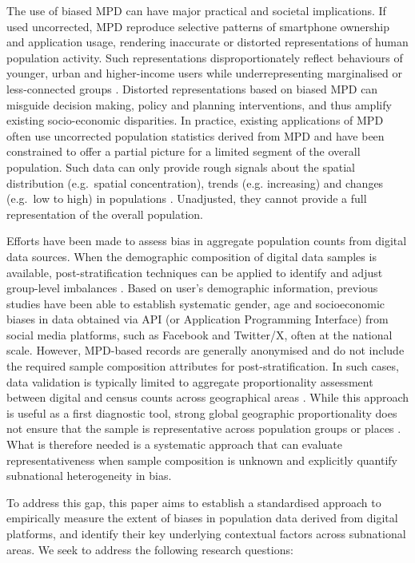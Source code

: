 \documentclass[]{rsos}%
\begin{document}
The use of biased MPD can have major practical and societal
implications. If used uncorrected, MPD reproduce selective patterns of
smartphone ownership and application usage, rendering inaccurate or
distorted representations of human population activity. Such
representations disproportionately reflect behaviours of younger, urban
and higher-income users while underrepresenting marginalised or
less-connected groups \citep{porter2012, wesolowski13-biases}. Distorted
representations based on biased MPD can misguide decision making, policy
and planning interventions, and thus amplify existing socio-economic
disparities. In practice, existing applications of MPD often use
uncorrected population statistics derived from MPD and have been
constrained to offer a partial picture for a limited segment of the
overall population. Such data can only provide rough signals about the
spatial distribution (e.g.~spatial concentration), trends (e.g.
increasing) and changes (e.g.~low to high) in populations
\citep{rowe22-sensing-ukraine}. Unadjusted, they cannot provide a full
representation of the overall population.

Efforts have been made to assess bias in aggregate population counts
from digital data sources. When the demographic composition of digital
data samples is available, post-stratification techniques can be applied
to identify and adjust group-level imbalances \citep{ribeiro20-facebook, gil-clavel2019}. Based on user's demographic information, previous
studies have been able to establish systematic gender, age and
socioeconomic biases in data obtained via API (or Application
Programming Interface) from social media platforms, such as Facebook and
Twitter/X, often at the national scale. However, MPD-based records are
generally anonymised and do not include the required sample composition
attributes for post-stratification. In such cases, data validation is
typically limited to aggregate proportionality assessment between
digital and census counts across geographical areas \citep{renninger2026, wang2022, moro2021, cabrera25}. While this approach is useful as a
first diagnostic tool, strong global geographic proportionality does not
ensure that the sample is representative across population groups or
places \citep{rowe2021using, iradukunda2025estimating, sinclair23}. What is
therefore needed is a systematic approach that can evaluate
representativeness when sample composition is unknown and explicitly
quantify subnational heterogeneity in bias.

To address this gap, this paper aims to establish a standardised
approach to empirically measure the extent of biases in population data
derived from digital platforms, and identify their key underlying
contextual factors across subnational areas. We seek to address the
following research questions:
\end{document}
